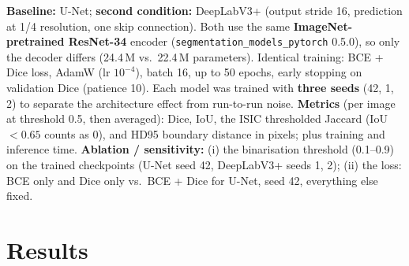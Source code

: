 \documentclass[11pt,a4paper]{article}
\begin{document}
\textbf{Baseline:} U-Net; \textbf{second condition:} DeepLabV3+ (output stride 16, prediction at 1/4 resolution,
one skip connection). Both use the same \textbf{ImageNet-pretrained ResNet-34} encoder
(\texttt{segmentation\_models\_pytorch} 0.5.0), so only the decoder differs (24.4\,M vs.\ 22.4\,M parameters).
Identical training: BCE + Dice loss, AdamW (lr $10^{-4}$), batch 16, up to 50 epochs, early stopping on validation
Dice (patience 10). Each model was trained with \textbf{three seeds} (42, 1, 2) to separate the architecture effect
from run-to-run noise. \textbf{Metrics} (per image at threshold 0.5, then averaged): Dice, IoU, the ISIC thresholded
Jaccard (IoU $<0.65$ counts as 0), and HD95 boundary distance in pixels; plus training and inference time.
\textbf{Ablation / sensitivity:} (i) the binarisation threshold (0.1--0.9) on the trained checkpoints
(U-Net seed 42, DeepLabV3+ seeds 1, 2); (ii) the loss: BCE only and Dice only vs.\ BCE + Dice for U-Net, seed 42,
everything else fixed.

\section{Results}
\end{document}
